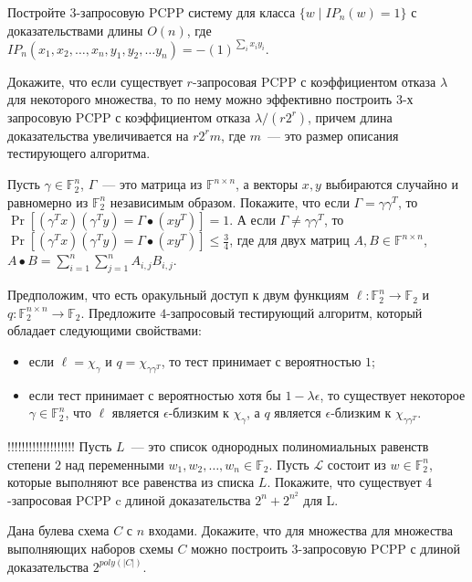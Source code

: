 \begin{task}
	Постройте $3$-запросовую PCPP систему для класса $\{w \mid IP_n(w) = 1\}$ с доказательствами длины $O(n)$, где $IP_n(x_1, x_2,
    \dots, x_n, y_1, y_2,\dots y_n) = -(1)^{\sum\limits_i x_i y_i}$.
\end{task}


\begin{task}
    Докажите, что если существует $r$-запросовая PCPP с коэффициентом отказа $\lambda$ для некоторого множества, то по нему можно
    эффективно построить $3$-х запросовую PCPP с коэффициентом отказа $\lambda / (r 2^r)$, причем длина доказательства
    увеличивается на $r 2^rm$, где $m$~--- это размер описания тестирующего алгоритма.
\end{task}

\begin{task}
    Пусть $\gamma \in \mathbb{F}_2^n$, $\Gamma$~--- это матрица из $\mathbb{F}^{n \times n}$, а векторы $x, y$ выбираются случайно
    и равномерно из $\mathbb{F}_2^n$ независимым образом. Покажите, что если $\Gamma = \gamma \gamma^T$, то
    $\Pr[(\gamma^T x) (\gamma^T y) = \Gamma \bullet (x y^T)] = 1$. А если $\Gamma \neq \gamma \gamma^T$, то
    $\Pr[(\gamma^T x) (\gamma^T y) = \Gamma \bullet (x y^T)] \le \frac{3}{4}$, где для двух матриц $A, B \in
    \mathbb{F}^{n \times n}$, $A \bullet B = \sum\limits_{i = 1}^n \sum\limits_{j = 1}^n A_{i, j} B_{i, j}$.
\end{task}


\begin{task}
	Предположим, что есть оракульный доступ к двум функциям $\ell: \mathbb{F}_2^n \to \mathbb{F}_2$ и
    $q: \mathbb{F}_2^{n \times n} \to \mathbb{F}_2$. Предложите $4$-запросовый тестирующий алгоритм, который обладает следующими
    свойствами:
    \begin{itemize}
        \item если $\ell = \chi_{\gamma}$ и $q = \chi_{\gamma \gamma^T}$, то тест принимает с вероятностью $1$;
        \item если тест принимает с вероятностью хотя бы $1 - \lambda \epsilon$, то существует некоторое $\gamma \in
			\mathbb{F}_2^n$, что $\ell$ является $\epsilon$-близким к $\chi_\gamma$, а $q$ является $\epsilon$-близким к $\chi_{\gamma \gamma^T}$.
    \end{itemize}
\end{task}


\begin{task}{!!!!!!!!!!!!!!!!!!!}
    Пусть $L$~--- это список однородных полиномиальных равенств степени $2$ над переменными $w_1, w_2, \dots, w_n \in
    \mathbb{F}_2$. Пусть $\mathcal{L}$ состоит из $w \in \mathbb{F}_2^n$, которые выполняют все равенства из списка $L$. Покажите,
    что существует $4$-запросовая PCPP c длиной доказательства $2^n + 2^{n^2}$ для L.
\end{task}


\begin{task}
    Дана булева схема $C$ с $n$ входами. Докажите, что для множества для множества выполняющих наборов схемы $C$ можно построить
    $3$-запросовую PCPP с длиной доказательства $2^{poly (|C|)}$.
\end{task}


